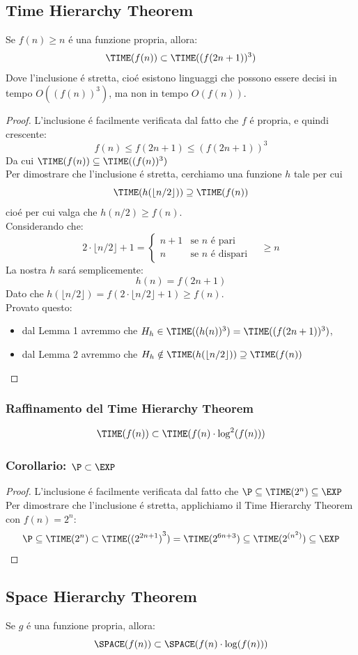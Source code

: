 \subsection{Time Hierarchy Theorem}
Se $f(n) \geq n$ é una funzione propria, allora:
\[\TIME(f(n)) \subset \TIME((f(2n + 1))^3)\]
Dove l'inclusione é stretta, cioé esistono linguaggi che possono essere decisi in tempo $O((f(n))^3)$, ma non in tempo $O(f(n))$.
\begin{proof}
L'inclusione é facilmente verificata dal fatto che $f$ é propria, e quindi crescente: 
\[f(n) \leq f(2n + 1) \leq (f(2n + 1))^3\]
Da cui $\TIME(f(n)) \subseteq \TIME((f(n))^3)$ \\

Per dimostrare che l'inclusione é stretta, cerchiamo una funzione $h$ tale per cui
\[\TIME(h(\lfloor n/2 \rfloor)) \supseteq \TIME(f(n))\]
cioé per cui valga che $h(n/2) \geq f(n)$. \\

Considerando che:
\[
2 \cdot \lfloor n/2 \rfloor + 1 =
\begin{cases}
    n + 1 & \text{se $n$ é pari} \\
    n     & \text{se $n$ é dispari}
\end{cases}
\quad \geq n
\]
La nostra $h$ sará semplicemente:
\[h(n) = f(2n + 1)\]
Dato che $h(\lfloor n/2 \rfloor) = f(2 \cdot \lfloor n/2 \rfloor + 1) \geq f(n)$. \\

Provato questo:
\begin{itemize}
    \item dal Lemma 1 avremmo che $H_h \in \TIME((h(n))^3) = \TIME((f(2n + 1))^3)$, 
    \item dal Lemma 2 avremmo che $H_h \notin \TIME(h(\lfloor n/2 \rfloor)) \supseteq \TIME(f(n))$
\end{itemize}    
\end{proof}

\subsubsection{Raffinamento del Time Hierarchy Theorem}
\[\TIME(f(n)) \subset \TIME(f(n) \cdot \log^2(f(n)))\]

\subsubsection{Corollario: $\P \subset \EXP$}
\begin{proof}
    L'inclusione é facilmente verificata dal fatto che $\P \subseteq \TIME(2^n) \subseteq \EXP$ \\
    Per dimostrare che l'inclusione é stretta, applichiamo il Time Hierarchy Theorem con $f(n) = 2^n$:
    \[\P \subseteq \TIME(2^n) \subset \TIME({(2^{2n+1})}^3) = \TIME(2^{6n+3}) \subseteq \TIME(2^{(n^2)}) \subseteq \EXP\]
\end{proof}

\subsection{Space Hierarchy Theorem}
Se $g$ é una funzione propria, allora:
\[\SPACE(f(n)) \subset \SPACE(f(n) \cdot \log(f(n)))\]